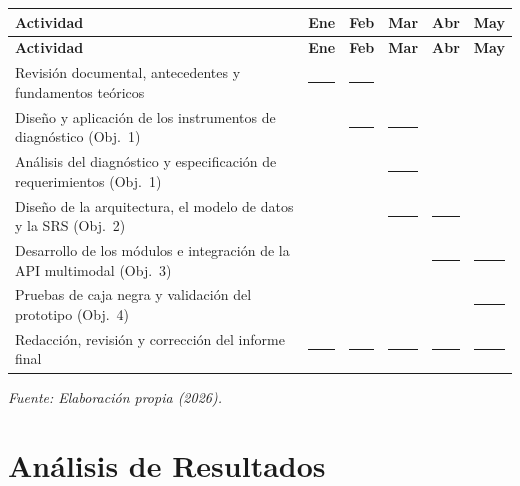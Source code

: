 \documentclass[12pt, letterpaper]{report}
\begin{document}
\newcommand{\barragantt}{\rule{0.7cm}{6pt}}
\scriptsize
\setlength{\tabcolsep}{3pt}
\begin{longtable}{|>{\raggedright\arraybackslash}p{6.3cm}|c|c|c|c|c|}
\hline
\textbf{Actividad} & \textbf{Ene} & \textbf{Feb} & \textbf{Mar} &
\textbf{Abr} & \textbf{May} \\
\hline
\endfirsthead
\hline
\textbf{Actividad} & \textbf{Ene} & \textbf{Feb} & \textbf{Mar} &
\textbf{Abr} & \textbf{May} \\
\hline
\endhead
\hline
\endfoot
Revisión documental, antecedentes y fundamentos teóricos &
\barragantt & \barragantt & & & \\
\hline
Diseño y aplicación de los instrumentos de diagnóstico (Obj.\ 1) &
& \barragantt & \barragantt & & \\
\hline
Análisis del diagnóstico y especificación de requerimientos (Obj.\ 1) &
& & \barragantt & & \\
\hline
Diseño de la arquitectura, el modelo de datos y la SRS (Obj.\ 2) &
& & \barragantt & \barragantt & \\
\hline
Desarrollo de los módulos e integración de la API multimodal (Obj.\ 3) &
& & & \barragantt & \barragantt \\
\hline
Pruebas de caja negra y validación del prototipo (Obj.\ 4) &
& & & & \barragantt \\
\hline
Redacción, revisión y corrección del informe final &
\barragantt & \barragantt & \barragantt & \barragantt & \barragantt \\
\hline
\end{longtable}
\setlength{\tabcolsep}{6pt}
\normalsize

\vspace{2pt}
\noindent\small\textit{Fuente: Elaboración propia (2026).}\normalsize
{}

\chapter{Análisis de Resultados}
\end{document}
